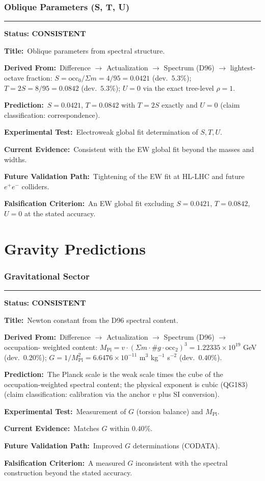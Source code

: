 \documentclass[11pt,a4paper]{article}
\newcommand{\predstart}[2]{%
  \par\medskip\noindent\hrule\par\smallskip
  \noindent{\large\bfseries #1}\hfill{\bfseries Status: #2}\par\smallskip
}
\newcommand{\pfield}[2]{%
  \noindent\textbf{#1:}~#2\par\smallskip
}
\begin{document}
\section{Oblique Parameters (S, T, U)}
\label{sec:oblique}

\predstart{AT-P017}{CONSISTENT}
\pfield{Title}{Oblique parameters from spectral structure.}
\pfield{Derived From}{Difference $\to$ Actualization $\to$ Spectrum (D96) $\to$ lightest-
octave fraction: $S = \mathrm{occ}_0/\Sigma m = 4/95 = 0.0421$ (dev.\ $5.3\%$);
$T = 2S = 8/95 = 0.0842$ (dev.\ $5.3\%$); $U = 0$ via the exact tree-level $\rho = 1$.}
\pfield{Prediction}{$S = 0.0421$, $T = 0.0842$ with $T = 2S$ exactly and $U = 0$
(claim classification: correspondence).}
\pfield{Experimental Test}{Electroweak global fit determination of $S,T,U$.}
\pfield{Current Evidence}{Consistent with the EW global fit beyond the masses and widths.}
\pfield{Future Validation Path}{Tightening of the EW fit at HL-LHC and future $e^+e^-$
colliders.}
\pfield{Falsification Criterion}{An EW global fit excluding $S = 0.0421$, $T = 0.0842$,
$U = 0$ at the stated accuracy.}

\part{Gravity Predictions}

\section{Gravitational Sector}
\label{sec:gravity}

\predstart{AT-P018}{CONSISTENT}
\pfield{Title}{Newton constant from the D96 spectral content.}
\pfield{Derived From}{Difference $\to$ Actualization $\to$ Spectrum (D96) $\to$ occupation-
weighted content: $M_{\mathrm{Pl}} = v\cdot(\Sigma m\cdot\#g\cdot\mathrm{occ}_2)^3 =
1.22335\times10^{19}$ GeV (dev.\ $0.20\%$); $G = 1/M_{\mathrm{Pl}}^2 = 6.6476\times10^{-11}$
m$^3$ kg$^{-1}$ s$^{-2}$ (dev.\ $0.40\%$).}
\pfield{Prediction}{The Planck scale is the weak scale times the cube of the
occupation-weighted spectral content; the physical exponent is cubic (QG183)
(claim classification: calibration via the anchor $v$ plus SI conversion).}
\pfield{Experimental Test}{Measurement of $G$ (torsion balance) and $M_{\mathrm{Pl}}$.}
\pfield{Current Evidence}{Matches $G$ within $0.40\%$.}
\pfield{Future Validation Path}{Improved $G$ determinations (CODATA).}
\pfield{Falsification Criterion}{A measured $G$ inconsistent with the spectral construction
beyond the stated accuracy.}
\end{document}

